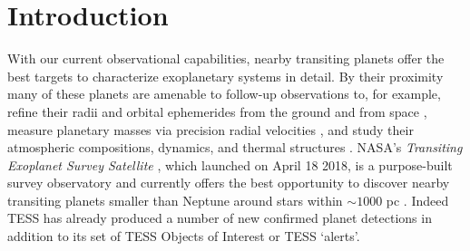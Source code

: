 
\section{Introduction}
With our current observational capabilities, nearby transiting planets offer the best targets
to characterize exoplanetary systems in detail. By their proximity many of
these planets are amenable to follow-up observations to, for example, refine their radii and orbital
ephemerides from the ground \citep{stefansson17,cooke18} and from space \citep{broeg13,gaidos17},
measure planetary masses via precision radial velocities \citep{cloutier18b}, and study
their atmospheric compositions, dynamics, and thermal structures \citep{louie18,kempton18}. NASA's
\emph{Transiting Exoplanet Survey Satellite} \citep[TESS;][]{ricker15}, which launched on April 18
2018, is a purpose-built survey observatory and currently offers the best opportunity to discover
nearby transiting planets smaller than Neptune around stars within $\sim 1000$ pc \citep{stassun17}.
Indeed TESS has already produced a number of new confirmed planet detections
\citep{esposito18,gandolfi18,huang18a,trifonov18,vanderspek18} %
in addition to its set of TESS Objects of Interest or TESS `alerts'. \\

